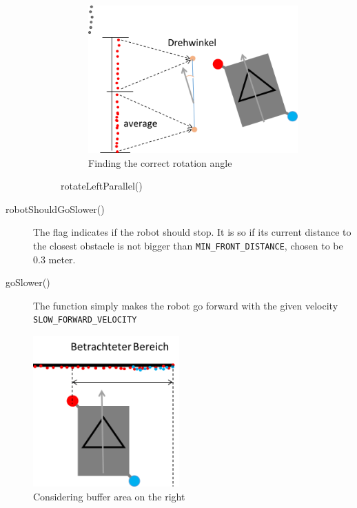 \begin{description}
\begin{figure}[htb]
\begin{subfigure}{.65\textwidth}
	\centering
	\includegraphics[width=0.9\linewidth]{graphics/rotate_left_parallel02.png}
	\caption{Finding the correct rotation angle}
	\label{rotate_left_parallel02}
\centering
\end{subfigure}
\caption{rotateLeftParallel()}
\label{fig:side_by_side}
\end{figure}

\item[robotShouldGoSlower()]  The flag indicates if the robot should stop. It is so if its current distance to the closest obstacle is not bigger than \texttt{MIN\_FRONT\_DISTANCE}, chosen to be 0.3 meter.

\item[goSlower()] The function simply makes the robot go forward with the given velocity \\ \texttt{SLOW\_FORWARD\_VELOCITY}

\end{description}

\begin{figure}[htb]
\centering
\includegraphics[width=0.5\textwidth]{graphics/betrachteter_bereich.png}
\caption{Considering buffer area on the right}
\label{betrachteter_bereich}
\centering
\end{figure}

